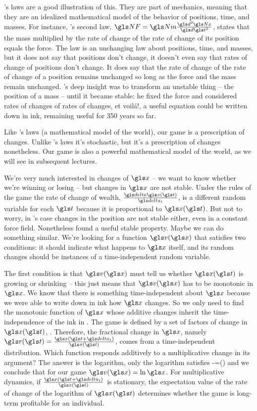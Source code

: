 's laws are a good illustration of this. They are part of mechanics, meaning that they
are an idealized mathematical model of the behavior of positions, time, and masses. 
For instance, 's second law, $\NF=\Nm \frac{\gd^2 \Nx}{\gd\t^2}$, states that the mass multiplied by 
the rate of change of the rate of change of its position equals the force. The law is an unchanging 
law about positions, time, and masses, but it does not say that positions don't change, it doesn't even say 
that rates of change of positions don't change. It does say that the rate of change of the 
rate of change of a position remains unchanged so long as the force and the mass 
remain unchanged. 's deep insight was to transform an unstable thing -- the position of a mass --
until it became stable: he fixed the force and considered rates of changes of rates of changes, et 
voil\'a!, a useful equation could be written down in ink, remaining useful for 350 years so far.

Like 's laws (a mathematical model of the world), our game is a prescription of changes. 
Unlike 's laws it's stochastic, but it's a prescription of changes nonetheless. 
Our game is also a powerful mathematical model of the world, as we will see in subsequent lectures. 

We're very much interested in changes of $\x$ -- we want to know 
whether we're winning or losing -- but changes in $\x$ are not stable. 
Under the rules of the game the rate of change of wealth, $\frac{\d \x(\t)}{\dt}$, is a different 
random variable for each $\t$ because it is proportional to $\x(\t)$. But not to worry, 
in 's case changes in the position are not stable either, even in a 
constant force field. Nonetheless  found a useful stable property. 
Maybe we can do something similar. We're looking for a function $\gv(\x)$ that satisfies two conditions: 
it should indicate what happens to $\x$ itself, and its random changes should be instances of a time-independent random variable.

The first condition is that $\gv(\x)$ must tell us 
whether $\x(\t)$ is growing or shrinking -- this just means that $\gv(\x)$ has to 
be monotonic in $\x$. We know that there is something time-independent
about $\x$ because we were able to write down in ink how $\x$ changes. So we only need 
to find the monotonic function of $\x$ whose additive changes inherit the time-independence 
of the ink in . The game is defined by a set of factors of change in $\x(\t)$, . 
Therefore, the fractional change in $\x$, namely
$\gr(\t) = \frac{\x(\t+\dt)}{\x(\t)}$, comes from a time-independent distribution. Which 
function responds additively to a multiplicative change in its argument? 
The answer is the logarithm, \ie
only the logarithm satisfies
\be
\gv[\x(\t+\dt)]-\gv[\x(\t)]=\gv \left(\frac{\x(\t+\dt)}{\x(\t)}\right)
\ee
and we conclude that for our game $\gv(\x)=\ln\x$.
For multiplicative dynamics, \ie if $\frac{\x(\t+\dt)}{\x(\t)}$ is stationary, the expectation 
value of the rate of change of the logarithm of $\x(\t)$ determines whether the game is long-term profitable 
for an individual.

